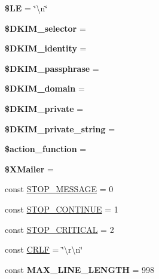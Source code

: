 \begin{DoxyCompactItemize}
\mbox{\label{class_p_h_p_mailer_ab0c4941bda43ab5a330a712d036c7ae5}} 
{\bfseries \$\+LE} = \char`\"{}\textbackslash{}n\char`\"{}
\item 
\mbox{\label{class_p_h_p_mailer_afa2553a1ceb268e2e40eec38f235851b}} 
{\bfseries \$\+D\+K\+I\+M\+\_\+selector} = \textquotesingle{}\textquotesingle{}
\item 
\mbox{\label{class_p_h_p_mailer_acf9024f1cac01f6e7ed6c906bbd6dc5a}} 
{\bfseries \$\+D\+K\+I\+M\+\_\+identity} = \textquotesingle{}\textquotesingle{}
\item 
\mbox{\label{class_p_h_p_mailer_a3efe2b20aa6a85e7623ab175a2a38c14}} 
{\bfseries \$\+D\+K\+I\+M\+\_\+passphrase} = \textquotesingle{}\textquotesingle{}
\item 
\mbox{\label{class_p_h_p_mailer_afea9d50183287a5b1d4343d9791a1211}} 
{\bfseries \$\+D\+K\+I\+M\+\_\+domain} = \textquotesingle{}\textquotesingle{}
\item 
\mbox{\label{class_p_h_p_mailer_a1dddb5e4502ab2a5d05869ea66aaaef5}} 
{\bfseries \$\+D\+K\+I\+M\+\_\+private} = \textquotesingle{}\textquotesingle{}
\item 
\mbox{\label{class_p_h_p_mailer_a95407c8606fdeab14c164f276ac085f5}} 
{\bfseries \$\+D\+K\+I\+M\+\_\+private\+\_\+string} = \textquotesingle{}\textquotesingle{}
\item 
\mbox{\label{class_p_h_p_mailer_a7b21538b6755c155217ac9bc08f30502}} 
{\bfseries \$action\+\_\+function} = \textquotesingle{}\textquotesingle{}
\item 
\mbox{\label{class_p_h_p_mailer_a10d8959c54bddeca080e82581657057c}} 
{\bfseries \$\+X\+Mailer} = \textquotesingle{}\textquotesingle{}
\item 
const \mbox{\hyperlink{class_p_h_p_mailer_a84dc28f3f0eb955044cb1f559d40253b}{S\+T\+O\+P\+\_\+\+M\+E\+S\+S\+A\+GE}} = 0
\item 
const \mbox{\hyperlink{class_p_h_p_mailer_acb27435a7e929b1e41e476c5067ddd43}{S\+T\+O\+P\+\_\+\+C\+O\+N\+T\+I\+N\+UE}} = 1
\item 
const \mbox{\hyperlink{class_p_h_p_mailer_a4b6cdf657bb4ded1f91020a2d26e31ab}{S\+T\+O\+P\+\_\+\+C\+R\+I\+T\+I\+C\+AL}} = 2
\item 
const \mbox{\hyperlink{class_p_h_p_mailer_a5865a5896d97f9ab5352318a6fa19dab}{C\+R\+LF}} = \char`\"{}\textbackslash{}r\textbackslash{}n\char`\"{}
\item 
\mbox{\label{class_p_h_p_mailer_af1d345aa034ec6a5259bc3b08e6a5cea}} 
const {\bfseries M\+A\+X\+\_\+\+L\+I\+N\+E\+\_\+\+L\+E\+N\+G\+TH} = 998
\end{DoxyCompactItemize}
